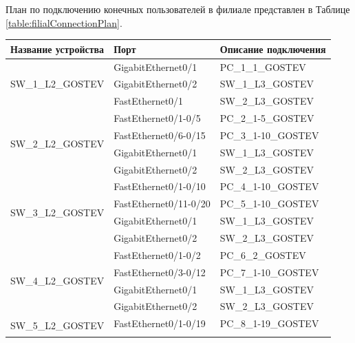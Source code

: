 \documentclass[14pt, a4paper]{extarticle}
\numberwithin{equation}{section}
\begin{document}
План по подключению конечных пользователей в филиале представлен в Таблице \ref{table:filialConnectionPlan}.
\begin{table}[H]
\small
\centering
\begin{tabular}{|l|l|l|}
\hline
\textbf{Название устройства}       & \textbf{Порт}          & \textbf{Описание подключения} \\ \hline
\multirow{3}{*}{SW\_1\_L2\_GOSTEV} & GigabitEthernet0/1     & PC\_1\_1\_GOSTEV              \\ \cline{2-3} 
                                   & GigabitEthernet0/2     & SW\_1\_L3\_GOSTEV             \\ \cline{2-3} 
                                   & FastEthernet0/1        & SW\_2\_L3\_GOSTEV             \\ \hline
\multirow{4}{*}{SW\_2\_L2\_GOSTEV} & FastEthernet0/1-0/5    & PC\_2\_1-5\_GOSTEV            \\ \cline{2-3} 
                                   & FastEthernet0/6-0/15   & PC\_3\_1-10\_GOSTEV           \\ \cline{2-3} 
                                   & GigabitEthernet0/1     & SW\_1\_L3\_GOSTEV             \\ \cline{2-3} 
                                   & GigabitEthernet0/2     & SW\_2\_L3\_GOSTEV             \\ \hline
\multirow{4}{*}{SW\_3\_L2\_GOSTEV} & FastEthernet0/1-0/10   & PC\_4\_1-10\_GOSTEV           \\ \cline{2-3} 
                                   & FastEthernet0/11-0/20  & PC\_5\_1-10\_GOSTEV           \\ \cline{2-3} 
                                   & GigabitEthernet0/1     & SW\_1\_L3\_GOSTEV             \\ \cline{2-3} 
                                   & GigabitEthernet0/2     & SW\_2\_L3\_GOSTEV             \\ \hline
\multirow{4}{*}{SW\_4\_L2\_GOSTEV} & FastEthernet0/1-0/2    & PC\_6\_2\_GOSTEV              \\ \cline{2-3} 
                                   & FastEthernet0/3-0/12   & PC\_7\_1-10\_GOSTEV           \\ \cline{2-3} 
                                   & GigabitEthernet0/1     & SW\_1\_L3\_GOSTEV             \\ \cline{2-3} 
                                   & GigabitEthernet0/2     & SW\_2\_L3\_GOSTEV             \\ \hline
\multirow{3}{*}{SW\_5\_L2\_GOSTEV} & FastEthernet0/1-0/19   & PC\_8\_1-19\_GOSTEV           \\ \cline{2-3} 

\end{tabular}
\end{table}
\end{document}
